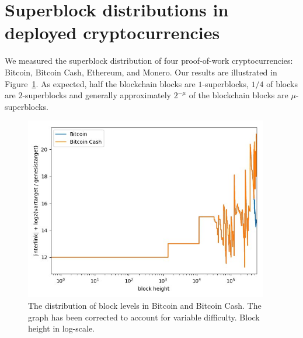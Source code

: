 \section{Superblock distributions in deployed cryptocurrencies}

We measured the superblock distribution of four proof-of-work cryptocurrencies:
Bitcoin, Bitcoin Cash, Ethereum, and Monero. Our results are illustrated in
Figure~\ref{fig.btc-bch-superblocks}. As expected, half the blockchain blocks are
$1$-superblocks, $1/4$ of blocks are $2$-superblocks and generally approximately
$2^{-\mu}$ of the blockchain blocks are $\mu$-superblocks.

\begin{figure}[h]
\begin{center}
  \includegraphics[width=0.95\textwidth]{figures/bitcoin-superblock-distribution.jpg}
  \caption{The distribution of block levels in Bitcoin and Bitcoin Cash. The
           graph has been corrected to account for variable difficulty. Block
           height in log-scale.}
  \label{fig.btc-bch-superblocks}
  \end{center}
\end{figure}
